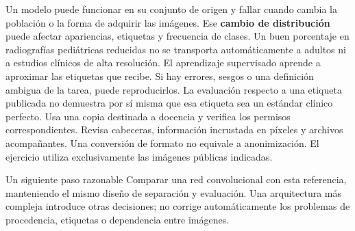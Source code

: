 \begin{center}
\end{center}
Un modelo puede funcionar en su conjunto de origen y fallar cuando cambia la población o la forma de adquirir las imágenes. Ese \textbf{cambio de distribución} puede afectar apariencias, etiquetas y frecuencia de clases. Un buen porcentaje en radiografías pediátricas reducidas no se transporta automáticamente a adultos ni a estudios clínicos de alta resolución.
El aprendizaje supervisado aprende a aproximar las etiquetas que recibe. Si hay errores, sesgos o una definición ambigua de la tarea, puede reproducirlos. La evaluación respecto a una etiqueta publicada no demuestra por sí misma que esa etiqueta sea un estándar clínico perfecto.
Usa una copia destinada a docencia y verifica los permisos correspondientes. Revisa cabeceras, información incrustada en píxeles y archivos acompañantes. Una conversión de formato no equivale a anonimización. El ejercicio utiliza exclusivamente las imágenes públicas indicadas.
\begin{Idea}{Un siguiente paso razonable}
Comparar una red convolucional con esta referencia, manteniendo el mismo diseño de separación y evaluación. Una arquitectura más compleja introduce otras decisiones; no corrige automáticamente los problemas de procedencia, etiquetas o dependencia entre imágenes.
\end{Idea}



